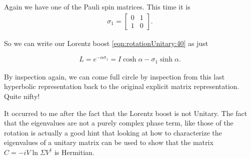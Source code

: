 Again we have one of the Pauli spin matrices.  This time it is
\begin{align}\label{eqn:rotationUnitary:42}
\sigma_1 =
\begin{bmatrix}
0 & 1 \\
1 & 0
\end{bmatrix}.
\end{align}

So we can write our Lorentz boost \ref{eqn:rotationUnitary:40} as just

\begin{align}\label{eqn:rotationUnitary:43}
L = e^{-\alpha \sigma_1} = I \cosh\alpha - \sigma_1 \sinh\alpha.
\end{align}

By inspection again, we can come full circle by inspection from this last hyperbolic representation back to the original explicit matrix representation.  Quite nifty!

It occurred to me after the fact that the Lorentz boost is not Unitary.  The fact that the eigenvalues are not a purely complex phase term, like those of the rotation is actually a good hint that looking at how to characterize the eigenvalues of a unitary matrix can be used to show that the matrix $C = -i V \ln \Sigma V^\dagger$ is Hermitian.

\EndArticle
